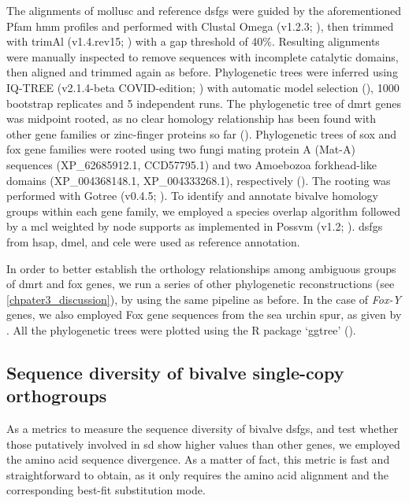 \documentclass[../main.tex]{subfiles}
\begin{document}
The alignments of mollusc and reference \glspl{dsfg} were guided by the aforementioned Pfam \gls{hmm} profiles and performed with Clustal Omega (v1.2.3; \textbf{\cite{sievers2011fast}}), then trimmed with trimAl (v1.4.rev15; \textbf{\cite{capella2009trimal}}) with a gap threshold of 40\%. Resulting alignments were manually inspected to remove sequences with incomplete catalytic domains, then aligned and trimmed again as before. Phylogenetic trees were inferred using IQ-TREE (v2.1.4-beta COVID-edition; \textbf{\cite{minh2020iq}}) with automatic model selection (\textbf{\cite{kalyaanamoorthy2017modelfinder}}), 1000 bootstrap replicates and 5 independent runs. The phylogenetic tree of \gls{dmrt} genes was midpoint rooted, as no clear homology relationship has been found with other gene families or zinc-finger proteins so far (\textbf{\cite{wexler2014pan}}). Phylogenetic trees of \gls{sox} and \gls{fox} gene families were rooted using two fungi mating protein A (Mat-A) sequences (XP\_62685912.1, CCD57795.1) and two Amoebozoa forkhead-like domains (XP\_004368148.1, XP\_004333268.1), respectively (\textbf{\cite{heenan2016evolution,nakagawa2013dna}}). The rooting was performed with Gotree (v0.4.5; \textbf{\cite{lemoine2021gotree}}). To identify and annotate bivalve homology groups within each gene family, we employed a species overlap algorithm followed by a \gls{mcl} weighted by node supports as implemented in Possvm (v1.2; \textbf{\cite{grau2021orthology}}). \glspl{dsfg} from \gls{hsap}, \gls{dmel}, and \gls{cele} were used as reference annotation.

In order to better establish the orthology relationships among ambiguous groups of \gls{dmrt} and \gls{fox} genes, we run a series of other phylogenetic reconstructions (see \ref{chpater3_discussion}), by using the same pipeline as before. In the case of \textit{Fox-Y} genes, we also employed Fox gene sequences from the sea urchin \gls{spur}, as given by \textbf{\cite{tu2006sea}}. All the phylogenetic trees were plotted using the R package ‘ggtree’ (\textbf{\cite{yu2017genome}}).

\subsection{Sequence diversity of bivalve single-copy orthogroups}
As a metrics to measure the sequence diversity of bivalve \glspl{dsfg}, and test whether those putatively involved in \gls{sd} show higher values than other genes, we employed the amino acid sequence divergence. As a matter of fact, this metric is fast and straightforward to obtain, as it only requires the amino acid alignment and the corresponding best-fit substitution mode.
\end{document}
